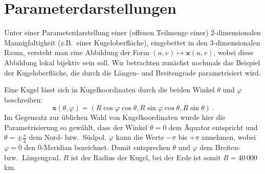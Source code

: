 \section{Parameterdarstellungen}
\label{sec_Parameter}

Unter einer Parameterdarstellung 
einer (offenen Teilmenge einer) 2-dimensionalen Mannigfaltigkeit 
(z.B.\ einer Kugeloberfl\"ache), eingebettet in den 3-dimensionalen Raum, versteht man eine Abbildung 
der Form $(u,v) \mapsto \pmb{x}(u,v)$, wobei diese Abbildung lokal bijektiv sein soll.
Wir betrachten zun\"achst nochmals das Beispiel der Kugeloberfl\"ache, die durch die L\"angen- und
Breitengrade parametrisiert wird. 

Eine Kugel l\"asst sich in Kugelkoordinaten 
durch die beiden Winkel $\theta$ und $\varphi$ beschreiben:
\begin{equation}
          \pmb{x}(\theta,\varphi) = (R \cos \varphi \cos \theta, R \sin \varphi \cos \theta, R \sin \theta) \, .
\end{equation}
Im Gegensatz zur \"ublichen Wahl von Kugelkoordinaten wurde hier die Parametrisierung
so gew\"ahlt, dass der Winkel $\theta=0$ dem \"Aquator entspricht und $\theta = \pm \frac{\pi}{2}$ dem
Nord- bzw.\ S\"udpol. $\varphi$ kann die Werte $-\pi$ bis $+\pi$ annehmen, wobei $\varphi=0$
den $0$-Meridian bezeichnet. Damit entsprechen $\theta$ und $\varphi$ dem Breiten- bzw.\ L\"angengrad. 
$R$ ist der Radius der Kugel, bei der Erde ist somit $R=40\,000$\,km.  

